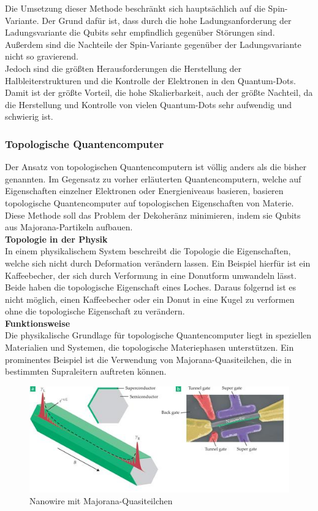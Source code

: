 Die Umsetzung dieser Methode beschränkt sich hauptsächlich auf die Spin-Variante. Der Grund dafür ist, dass durch die hohe Ladungsanforderung der Ladungsvariante die Qubits sehr empfindlich gegenüber Störungen sind.
Außerdem sind die Nachteile der Spin-Variante gegenüber der Ladungsvariante nicht so gravierend.\\
Jedoch sind die größten Herausforderungen die Herstellung der Halbleiterstrukturen und die Kontrolle der Elektronen in den Quantum-Dots.
Damit ist der größte Vorteil, die hohe Skalierbarkeit, auch der größte Nachteil, da die Herstellung und Kontrolle von vielen Quantum-Dots sehr aufwendig und schwierig ist.\\

\subsubsection{Topologische Quantencomputer}
\label{subsub:topologische_quantencomputer}
Der Ansatz von topologischen Quantencomputern ist völlig anders als die bisher genannten. Im Gegensatz zu vorher erläuterten Quantencomputern, welche auf Eigenschaften einzelner Elektronen oder Energieniveaus basieren, basieren topologische Quantencomputer auf topologischen Eigenschaften von Materie.\\
Diese Methode soll das Problem der Dekoheränz minimieren, indem sie Qubits aus Majorana-Partikeln aufbauen.\\

\textbf{Topologie in der Physik}\\
In einem physikalischem System beschreibt die Topologie die Eigenschaften, welche sich nicht durch Deformation verändern lassen.
Ein Beispiel hierfür ist ein Kaffeebecher, der sich durch Verformung in eine Donutform umwandeln lässt. Beide haben die topologische Eigenschaft eines Loches.
Daraus folgernd ist es nicht möglich, einen Kaffeebecher oder ein Donut in eine Kugel zu verformen ohne die topologische Eigenschaft zu verändern.\\

\textbf{Funktionsweise}\\
Die physikalische Grundlage für topologische Quantencomputer liegt in speziellen Materialien und Systemen, die topologische Materiephasen unterstützen.
Ein prominentes Beispiel ist die Verwendung von Majorana-Quasiteilchen, die in bestimmten Supraleitern auftreten können.\\

\begin{figure}[H]
    \centering
    \includegraphics[width=0.75\linewidth]{img/Majorana.png}
    \caption{Nanowire mit Majorana-Quasiteilchen}
    \label{fig:Majorana}
\end{figure}

